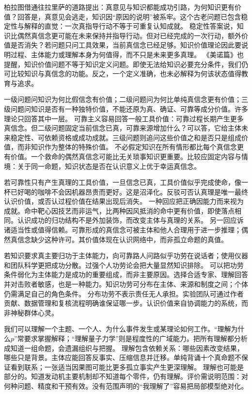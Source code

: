 柏拉图借通往拉里萨的道路提出：真意见与知识都能成功引路，为何知识更有价值？回答是，真意见会逃走，知识因“原因的说明”被系牢。这个古老问题已包含稳定性与解释的直觉：一次真指导行动不等于可重复认知成就。 稳定性答案说，知识比偶然真信念更可能在未来保持并指导行动。但对已经完成的一次行动，额外价值是否消失？若问题只问工具效果，当前真信念已经足够。知识价值理论因此要说明过程、主体能力或理解本身为何值得，而不只是未来更多真理。 《美诺篇》也提醒，知识价值问题不等于知识定义问题。即使无法给知识必要充分条件，我们仍可比较知识与真信念的功能。反之，一个定义准确，也未必解释为何该状态值得教育与追求。

一级问题问知识为何比假信念有价值；二级问题问为何比单纯真信念更有价值；三级问题问知识是否有一种独特价值，不能还原为真、确证、可靠等成分价值。许多理论只回答其中一层。 可靠主义容易回答一般工具价值：可靠过程长期产生更多真信念。但二级问题固定当前信念已真，可靠来源增加什么？可以答，它给主体未来稳定性、可依赖资格或成功成就。三级问题则追问这些价值之和是否只是组成价值，而非知识作为整体的特殊价值。 不必假定知识在所有情形都比每个真信念更有价值。一个救命的偶然真信念可能比无关琐事知识更重要。比较应固定内容与情境：关于同一命题，知识状态是否在认识意义上优于幸运真信念。

若可靠性只有产生真理的工具价值，一旦信念已真，工具价值似乎完成使命，像一杯已好喝的咖啡不会因机器昂贵而更好。这是沼泽化。反驳可否认真理是唯一最终认识价值，或否认过程价值在结果出现后消失。 一种回应把正确因能力而来视为成就。命中靶心因技艺而非运气，比两种因风抵消的命中更有价值，即使落点相同。认识成功的归功结构不是外加装饰，而改变主体与真理的关系。 另一回应诉诸适当性或值得信赖。可靠形成的真信念可被主体和他人合理用于进一步推理；偶然真信念缺少这种许可。其价值体现在认识网络中，而非孤立命题的真值。

若知识要求真主要归功于主体能力，向可靠路人问路似乎功劳在说话者；使用仪器和团队科学更把成功分散。过强个人功劳论会把大量显然知识排除。 可以把功劳条件弱化为主体能力是成功的重要组成，而非主要原因。选择合适专家、理解回答并对击败者敏感，也是一种能力。知识功劳可分布在主体、来源和制度之间；个体仍需满足自己的角色条件。 分布功劳不表示责任无人承担。实验团队可通过作者贡献、数据管理和复核流程明确谁保证哪一步。认识价值来自协调能力的系统，而非神秘群体心灵。

我们可以理解一个主题、一个人、为什么事件发生或某理论如何工作。“理解为什么$p$”常要求掌握解释；“理解量子力学”则是程度性的广域能力。把所有理解都分析成知道一组命题，会遗漏组织与把握。 理解包含依赖关系：哪些因素改变结果，哪些只是背景。主体应能回答反事实、压缩信息并迁移。单纯背诵十个真命题不保证看到联系；一张适当因果图可能比更多孤立事实产生更深理解。 理解也可能是部分的。知道发动机主要机制却不知道每个零件，仍有理解。评价需说明范围：对何种问题、精度和干预有效。没有范围声明的“我理解了”容易把局部模型绝对化。

